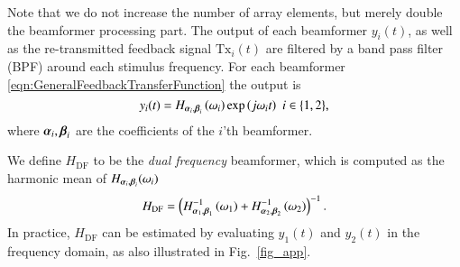 Note that we do not increase the number of array elements, but merely double the beamformer processing part. The output of each beamformer $y_i(t)$, as well as the re-transmitted feedback signal $\text{Tx}_i(t)$ are filtered by a band pass filter (BPF) around each stimulus frequency. For each beamformer \eqref{eqn:GeneralFeedbackTransferFunction} the output is
\[
y_{i}(t)=H_{\vAlpha_{i},\vBeta_{i}}\rBrace{\omega_{i}}\exp{\rBrace{j\omega_{i}t}}\ \ {i\in\cBrace{1,2}},
\]
where $\boldsymbol{\alpha}_{i},\boldsymbol{\beta}_{i}$ are the coefficients of the $i$'th beamformer. 
\par We define $H_{\text{DF}}$ to be the \textit{dual frequency} beamformer, which is computed as the harmonic mean of $H_{\boldsymbol{\alpha}_{i},\boldsymbol{\beta}_{i}}(\omega_i)$ 
\begin{equation*}
    H_{\text{DF}} = \left({H^{-1}_{\boldsymbol{\alpha}_{1},\boldsymbol{\beta}_{1}}\left({\omega_{1}}\right)+H^{-1}_{\boldsymbol{\alpha}_{2},\boldsymbol{\beta}_{2}}\left({\omega_{2}}\right)}\right)^{-1}.
\end{equation*}
In practice, $H_{\text{DF}}$ can be estimated by evaluating $y_1(t)$ and $y_2(t)$ in the frequency domain, as also illustrated in Fig.~\ref{fig_app}.


